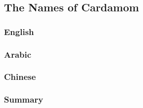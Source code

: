 \subsection{The Names of Cardamom}

\subsubsection{English}





\subsubsection{Arabic}



\subsubsection{Chinese}



\subsubsection{Summary}

